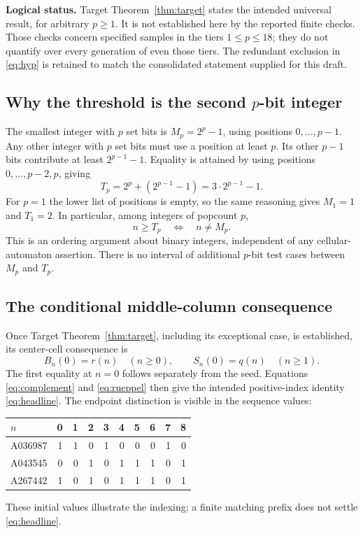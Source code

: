 \documentclass[11pt]{article}
\begin{document}
\noindent\textbf{Logical status.}
Target Theorem~\ref{thm:target} states the intended universal result, for
arbitrary $p\geq1$. It is not established here by the reported finite
checks. Those checks concern specified samples in the tiers $1\leq p\leq18$;
they do not quantify over every generation of even those tiers. The
redundant exclusion in \eqref{eq:hyp} is retained to match the consolidated
statement supplied for this draft.

\subsection{Why the threshold is the second \texorpdfstring{$p$}{p}-bit integer}

The smallest integer with $p$ set bits is $M_p=2^p-1$, using positions
$0,\ldots,p-1$. Any other integer with $p$ set bits must use a position
at least $p$. Its other $p-1$ bits contribute at least $2^{p-1}-1$.
Equality is attained by using positions $0,\ldots,p-2,p$, giving
\[
 T_p=2^p+(2^{p-1}-1)=3\cdot2^{p-1}-1.
\]
For $p=1$ the lower list of positions is empty, so the same reasoning gives
$M_1=1$ and $T_1=2$. In particular, among integers of popcount $p$,
\begin{equation}
 n\geq T_p\quad\Longleftrightarrow\quad n\ne M_p.
 \label{eq:second}
\end{equation}
This is an ordering argument about binary integers, independent of any
cellular-automaton assertion. There is no interval of additional $p$-bit
test cases between $M_p$ and $T_p$.

\subsection{The conditional middle-column consequence}

Once Target Theorem~\ref{thm:target}, including its exceptional case, is
established, its center-cell consequence is
\begin{equation}
 B_n(0)=r(n)\quad(n\geq0),\qquad
 S_n(0)=q(n)\quad(n\geq1).
 \label{eq:center}
\end{equation}
The first equality at $n=0$ follows separately from the seed. Equations
\eqref{eq:complement} and \eqref{eq:rueppel} then give the intended
positive-index identity \eqref{eq:headline}. The endpoint distinction is
visible in the sequence values:
\begin{center}
\begin{tabular}{lrrrrrrrrr}
\toprule
$n$ & 0&1&2&3&4&5&6&7&8\\
\midrule
A036987 & 1&1&0&1&0&0&0&1&0\\
A043545 & 0&0&1&0&1&1&1&0&1\\
A267442 & 1&0&1&0&1&1&1&0&1\\
\bottomrule
\end{tabular}
\end{center}
These initial values illustrate the indexing; a finite matching prefix
does not settle \eqref{eq:headline}.
\end{document}
